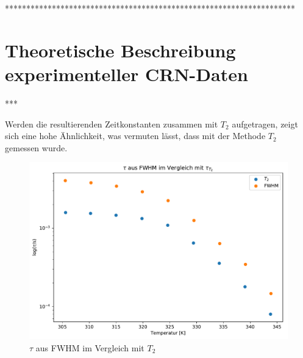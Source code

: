 ********************************************************************


\section{Theoretische Beschreibung experimenteller CRN-Daten} \label{section:theo:daten}


















***

Werden die resultierenden Zeitkonstanten zusammen mit $T_2$ aufgetragen, zeigt sich eine hohe Ähnlichkeit, was vermuten lässt, dass mit der Methode $T_2$ gemessen wurde.
\begin{figure}
	\begin{center}
		\includegraphics[width=\textwidth]{graphics/plots/SPEKDYN/spekdyn_t2.pdf}
	\end{center}
	\caption{$\tau$ aus FWHM im Vergleich mit $T_2$} \label{fig:res:spekdyn_t2}
\end{figure}
